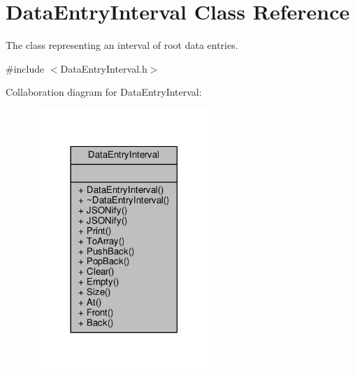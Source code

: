 \hypertarget{classDataEntryInterval}{\section{Data\+Entry\+Interval Class Reference}
\label{classDataEntryInterval}
}


The class representing an interval of root data entries.  




{\ttfamily \#include $<$Data\+Entry\+Interval.\+h$>$}



Collaboration diagram for Data\+Entry\+Interval\+:\nopagebreak
\begin{figure}[H]
\begin{center}
\leavevmode
\includegraphics[width=194pt]{classDataEntryInterval__coll__graph}
\end{center}
\end{figure}

